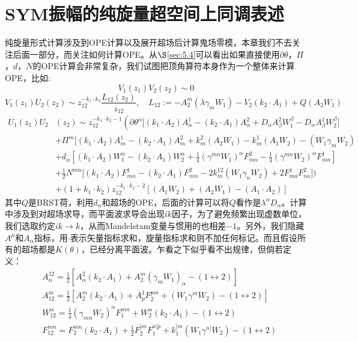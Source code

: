 \section{SYM振幅的纯旋量超空间上同调表述}
纯旋量形式计算涉及到OPE计算以及展开超场后计算鬼场零模，本章我们不去关注后面一部分，而关注如何计算OPE。从$\S$\ref{sec:5.4}可以看出如果直接使用$\partial\theta$，$\Pi$，$d$，$N$的OPE计算会非常复杂，我们试图把顶角算符本身作为一个整体来计算OPE，比如:
\begin{equation}
	V_1(z_1)V_2(z_2)\sim 0
\end{equation}
\begin{equation}
	\label{eq:6.17}
	V_1(z_1)U_2(z_2)\sim z_{12}^{-k_1\cdot k_2}\frac{L_{12}(z_2)}{z_{12}},\quad L_{12}:=-A_2^m(\lambda\gamma_mW_1)-V_2(k_2\cdot A_1)+Q(A_2W_1)
\end{equation}
\begin{equation}
	\label{eq:6.18}
	\begin{aligned}
		U_1(z_1)U_2&(z_2)\sim z_{12}^{-k_1\cdot k_2-1}\left(\partial\theta^\alpha\Big[(k_1\cdot A_2)A_\alpha^1-(k_2\cdot A_1)A_\alpha^2+D_\alpha A_\beta^2W_1^\beta-D_\alpha A_\beta^1W_2^\beta\Big]\right.\\&+\Pi^m\Big[(k_1\cdot A_2)A_m^1-(k_2\cdot A_1)A_m^2+k_m^2(A_2W_1)-k_m^1(A_1W_2)-(W_1\gamma_mW_2)\\&+d_\alpha\left[(k_1\cdot A_2)W_1^\alpha-(k_2\cdot A_1)W_2^\alpha+\frac14(\gamma^{mn}W_1)^\alpha F_{mn}^2-\frac14(\gamma^{mn}W_2)^\alpha F_{mn}^1\right]\\&+\frac12N^{mn}\Big[(k_1\cdot A_2)F_{mn}^1-(k_2\cdot A_1)F_{mn}^2-2k_m^{12}(W_1\gamma_nW_2)+2F_{ma}^1F_{na}^2\Big]\Big)\\&+(1+k_1\cdot k_2)z_{12}^{-k_1\cdot k_2-2}\left[(A_1W_2)+(A_2W_1)-(A_1\cdot A_2)\right]
	\end{aligned}
\end{equation}
其中$Q$是BRST荷，利用$d_\alpha$和超场的OPE，后面的计算可以将$Q$看作是$\lambda^\alpha D_\alpha$。计算中涉及到对超场求导，而平面波求导会出现$ik$因子，为了避免频繁出现虚数单位，我们选取约定$ik\to k$，从而Mandelstam变量与惯用的也相差$-1$。另外，我们隐藏$A^\mu$和$A_\alpha$指标，用$\cdot$表示矢量指标求和，旋量指标求和则不加任何标记。而且假设所有的超场都是$K(\theta)$，已经分离平面波。乍看之下似乎看不出规律，但倘若定义：
\begin{equation}
	\label{eq:6.19}
	\begin{aligned}
		&A_\alpha^{12}=\frac{1}{2}\left[A_\alpha^2(k_2\cdot A_1)+A_2^m(\gamma_mW_1)_\alpha-(1\leftrightarrow2)\right]
		\\&A_{12}^m=\frac{1}{2}\left[A_2^m(k_2\cdot A_1)+A_p^1F_2^{pm}+(W_1\gamma^mW_2)-(1\leftrightarrow2)\right]
		\\&W_{12}^{\alpha}=\frac{1}{4}(\gamma_{mn}W_2)^\alpha F_1^{mn}+W_2^\alpha(k_2\cdot A_1)-(1\leftrightarrow2)
		\\&F_{12}^{mn}=F_2^{mn}(k_2\cdot A_1)+\frac{1}{2}F_2^{[m}F_1^{n]p}+k_1^{[m}(W_1\gamma^{n]}W_2)-(1\leftrightarrow2)
	\end{aligned}
\end{equation}
